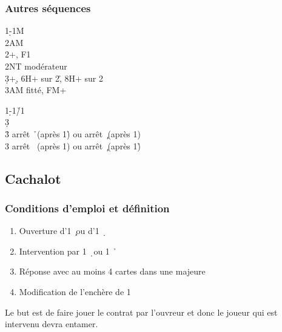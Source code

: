 \documentclass[a4paper]{article}
\begin{document}
\subsubsection{Autres séquences}

\begin{bidtable}
1\d-1M\\
2AM\+\\
2\s {}+\s , F1\\
2NT \> modérateur\\
3\d {}+\d , 6H+ sur 2\h , 8H+ sur 2\s \\
3AM \> fitté, FM+\-
\end{bidtable}

\begin{bidtable}
1\d-1\h/1\s\\
3\d\+\\
3\h \> arrêt \h\ (après 1\h ) ou arrêt \c\ (après 1\s )\\
3\s \> arrêt \s\ (après 1\s ) ou arrêt \c\ (après 1\h )\-
\end{bidtable}

\subsection{Cachalot}

\subsubsection{Conditions d'emploi et définition}

\begin{enumerate}
\item Ouverture d’1 \c\ ou d’1 \d\ 

\item Intervention par 1 \d\ ou 1 \h\ 

\item Réponse avec au moins 4 cartes dans une majeure

\item Modification de l’enchère de 1 \s 

\end{enumerate}

Le but est de faire jouer le contrat par l’ouvreur et donc le joueur 
qui est intervenu devra entamer.
\end{document}

